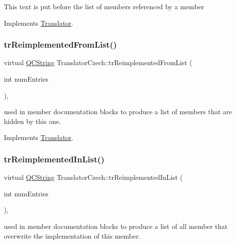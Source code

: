 This text is put before the list of members referenced by a member 

Implements \mbox{\hyperlink{class_translator}{Translator}}.

\mbox{\label{class_translator_czech_a846c95344a7bb1411aa7c71248c5a4bb}} 
\subsubsection{\texorpdfstring{trReimplementedFromList()}{trReimplementedFromList()}}
{\footnotesize\ttfamily virtual \mbox{\hyperlink{class_q_c_string}{Q\+C\+String}} Translator\+Czech\+::tr\+Reimplemented\+From\+List (\begin{DoxyParamCaption}\item[{int}]{num\+Entries }\end{DoxyParamCaption})\hspace{0.3cm}{\ttfamily [inline]}, {\ttfamily [virtual]}}

used in member documentation blocks to produce a list of members that are hidden by this one. 

Implements \mbox{\hyperlink{class_translator}{Translator}}.

\mbox{\label{class_translator_czech_abc2d7cab9e98ac06d13ba4befb4afbd6}} 
\subsubsection{\texorpdfstring{trReimplementedInList()}{trReimplementedInList()}}
{\footnotesize\ttfamily virtual \mbox{\hyperlink{class_q_c_string}{Q\+C\+String}} Translator\+Czech\+::tr\+Reimplemented\+In\+List (\begin{DoxyParamCaption}\item[{int}]{num\+Entries }\end{DoxyParamCaption})\hspace{0.3cm}{\ttfamily [inline]}, {\ttfamily [virtual]}}

used in member documentation blocks to produce a list of all member that overwrite the implementation of this member. 

